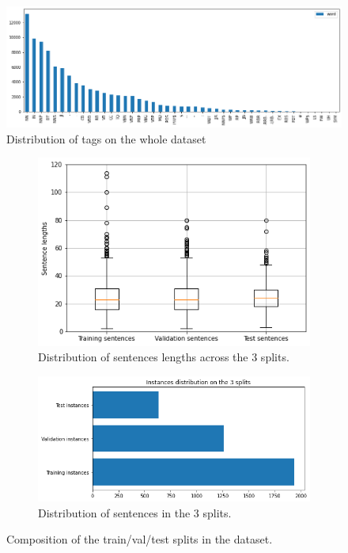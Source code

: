 \documentclass[letterpaper,10.8pt]{article}
\begin{document}
\begin{figure}[ht]
    \centering
    \includegraphics[width=\textwidth]{imgs/label_distr.png}
    \caption{Distribution of tags on the whole dataset}
    \label{fig:label_distr}
    \hfill
\end{figure}

\begin{figure}[ht]
    \begin{subfigure}[t]{0.43\textwidth}
        \centering
        \includegraphics[width=\textwidth]{imgs/len_distr.png}
        \caption{Distribution of sentences lengths across the 3 splits.}
        \label{fig:sentence_len}
    \end{subfigure}
    \hfill
    \begin{subfigure}[t]{0.54\textwidth}
        \centering
        \includegraphics[width=\textwidth]{imgs/split_distrib.png}
        \caption{Distribution of sentences in the 3 splits.}
        \label{fig:sentence_distr}
    \end{subfigure}
    \caption{Composition of the train/val/test splits in the dataset.}
\end{figure}
\end{document}

